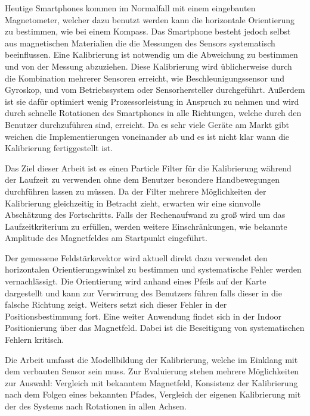Heutige Smartphones kommen im Normalfall mit einem eingebauten Magnetometer, welcher dazu benutzt werden kann die horizontale Orientierung zu bestimmen, wie bei einem Kompass. Das Smartphone besteht jedoch selbst aus magnetischen Materialien die die Messungen des Sensors systematisch beeinflussen. Eine Kalibrierung ist notwendig um die Abweichung zu bestimmen und von der Messung abzuziehen. Diese Kalibrierung wird üblicherweise durch die Kombination mehrerer Sensoren erreicht, wie Beschleunigungssensor und Gyroskop, und vom Betriebssystem oder Sensorhersteller durchgeführt. Außerdem ist sie dafür optimiert wenig Prozessorleistung in Anspruch zu nehmen und wird durch schnelle Rotationen des Smartphones in alle Richtungen, welche durch den Benutzer durchzuführen sind, erreicht. Da es sehr viele Geräte am Markt gibt weichen die Implementierungen voneinander ab und es ist nicht klar wann die Kalibrierung fertiggestellt ist.

Das Ziel dieser Arbeit ist es einen Particle Filter für die Kalibrierung während der Laufzeit zu verwenden ohne dem Benutzer besondere Handbewegungen durchführen lassen zu müssen. Da der Filter mehrere Möglichkeiten der Kalibrierung gleichzeitig in Betracht zieht, erwarten wir eine sinnvolle Abschätzung des Fortschritts. Falls der Rechenaufwand zu groß wird um das Laufzeitkriterium zu erfüllen, werden weitere Einschränkungen, wie bekannte Amplitude des Magnetfeldes am Startpunkt eingeführt.

Der gemessene Feldstärkevektor wird aktuell direkt dazu verwendet den horizontalen Orientierungswinkel zu bestimmen und systematische Fehler werden vernachlässigt. Die Orientierung wird anhand eines Pfeils auf der Karte dargestellt und kann zur Verwirrung des Benutzers führen falls dieser in die falsche Richtung zeigt. Weiters setzt sich dieser Fehler in der Positionsbestimmung fort.
Eine weiter Anwendung findet sich in der Indoor Positionierung über das Magnetfeld. Dabei ist die Beseitigung von systematischen Fehlern kritisch.

Die Arbeit umfasst die Modellbildung der Kalibrierung, welche im Einklang mit dem verbauten Sensor sein muss. Zur Evaluierung stehen mehrere Möglichkeiten zur Auswahl: Vergleich mit bekanntem Magnetfeld, Konsistenz der Kalibrierung nach dem Folgen eines bekannten Pfades, Vergleich der eigenen Kalibrierung mit der des Systems nach Rotationen in allen Achsen.
